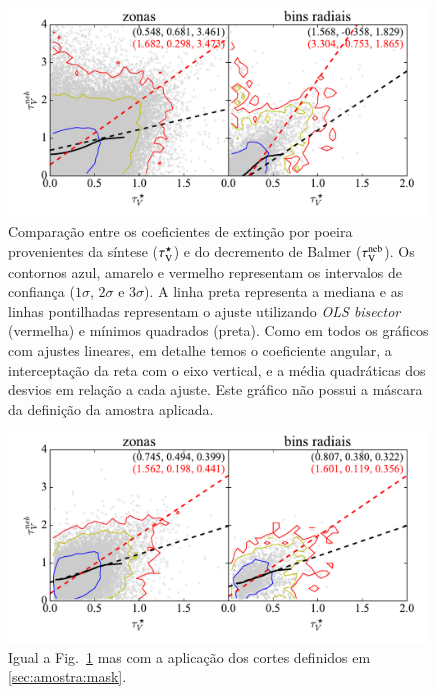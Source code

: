 \begin{figure}
	\centering
	\includegraphics[width=0.99\textwidth]{figuras/CompareTauV.pdf}
	\caption[Comparação entre os coeficientes de extinção]
	{Comparação entre os coeficientes de extinção por poeira provenientes da síntese ($\tau_{\mathrm{V}}^\star$) e
do decremento de Balmer ($\tau_{\mathrm{V}}^{\mathrm{neb}}$). Os contornos azul, amarelo e vermelho representam os
intervalos de confiança ($1\sigma$, $2\sigma$ e $3\sigma$). A linha preta representa a mediana e as linhas
pontilhadas representam o ajuste utilizando {\em OLS bisector} (vermelha) e mínimos quadrados
(preta). Como em todos os gráficos com ajustes lineares, em detalhe temos o coeficiente angular, a
interceptação da reta com o eixo vertical, e a média quadráticas dos desvios em relação a cada
ajuste. Este gráfico não possui a máscara da definição da amostra aplicada.}
	\label{fig:tauVsynvsneb}
\end{figure}

\begin{figure}
	\centering
	\includegraphics[width=0.99\textwidth]{figuras/CompareTauV_realsample.pdf}
	\caption[Comparação entre os coeficientes de extinção da amostra selecionada]
	{Igual a Fig.\ \ref{fig:tauVsynvsneb} mas com a aplicação dos cortes definidos em
\ref{sec:amostra:mask}.}
	\label{fig:tauVsynvsnebMask}
\end{figure}

